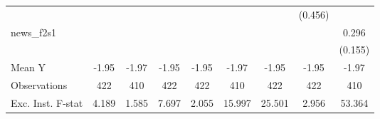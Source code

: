 {\begin{tabular}{l*{8}{c}}
            &                     &                     &                     &                     &                     &                     &     (0.456)         &                     \\
\addlinespace
news\_f2s1   &                     &                     &                     &                     &                     &                     &                     &       0.296\sym{*}  \\
            &                     &                     &                     &                     &                     &                     &                     &     (0.155)         \\
\midrule
Mean Y      &       -1.95         &       -1.97         &       -1.95         &       -1.95         &       -1.97         &       -1.95         &       -1.95         &       -1.97         \\
Observations&         422         &         410         &         422         &         422         &         410         &         422         &         422         &         410         \\
Exc. Inst. F-stat&       4.189         &       1.585         &       7.697         &       2.055         &      15.997         &      25.501         &       2.956         &      53.364         \\
\bottomrule
\end{tabular}
}
